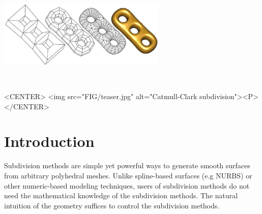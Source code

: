 
\ccParDims

\label{chapterSubdivision}



\minitoc

\begin{ccTexOnly}
  \begin{center}
    \parbox{0.6\textwidth}{%
      \includegraphics[width=0.6\textwidth]{Subdivision_method_3/FIG/teaser}
    }\\ \vspace{0.5cm}
  \end{center}
\end{ccTexOnly}

\begin{ccHtmlOnly}
     <CENTER>
         <img src="FIG/teaser.jpg" alt="Catmull-Clark subdivision"><P>
     </CENTER>
\end{ccHtmlOnly}

\section{Introduction} \label{sectionSubIntro}

Subdivision methods are simple yet powerful ways to 
generate smooth surfaces from arbitrary polyhedral meshes. 
Unlike spline-based surfaces (e.g NURBS) or other numeric-based 
modeling techniques, users of subdivision
methods do not need the mathematical knowledge of 
the subdivision methods. 
The natural intuition of the geometry suffices to control the 
subdivision methods. 

